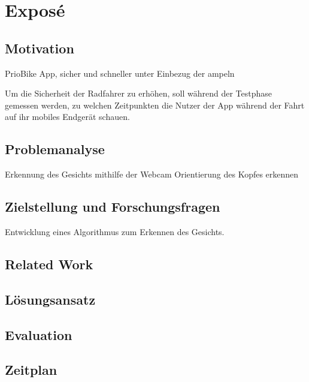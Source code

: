 \chapter{Exposé}\label{ch:Expose}

\section{Motivation}\label{sec:Expose:Motivation}


PrioBike App, sicher und schneller unter Einbezug der ampeln

Um die Sicherheit der Radfahrer zu erhöhen, soll während der Testphase gemessen werden, zu welchen Zeitpunkten die Nutzer der App während der Fahrt auf ihr mobiles Endgerät schauen. 


\section{Problemanalyse}\label{sec:Expose:Problemanalyse}


Erkennung des Gesichts mithilfe der Webcam
Orientierung des Kopfes erkennen



\section{Zielstellung und Forschungsfragen}\label{sec:Expose:Zielstellung}

Entwicklung eines Algorithmus zum Erkennen des Gesichts.



\section{Related Work}\label{sec:Expose:Related}

\section{Lösungsansatz}\label{sec:Expose:Lösungsansatz}

\section{Evaluation}\label{sec:Expose:Evaluation}



\section{Zeitplan}\label{sec:Expose:Zeitplan}

